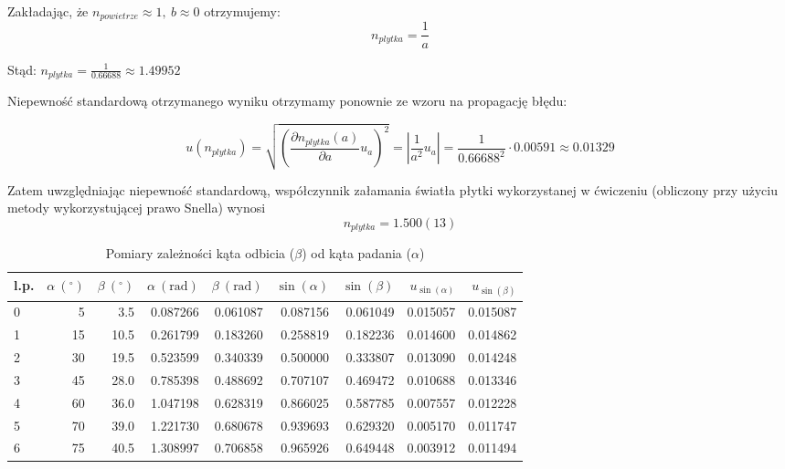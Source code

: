 \documentclass[a4paper]{article}
\newlength{\du}
\begin{document}
Zakładając, że $n_{powietrze} \approx 1, \ b \approx 0$ otrzymujemy:
\[ n_{plytka} = \frac{1}{a}\]

Stąd: $n_{plytka} = \frac{1}{0.66688} \approx 1.49952$

Niepewność standardową otrzymanego wyniku otrzymamy ponownie ze wzoru na propagację błędu:

\[
		u(n_{plytka}) = \sqrt{\left(\frac{\partial n_{plytka}(a)}{\partial a}u_{a}\right)^2} = 
		\left| \frac{1}{a^2} u_{a}\right| = \frac{1}{0.66688^2}\cdot 0.00591 \approx 0.01329
\]

Zatem uwzględniając niepewność standardową, współczynnik załamania światła płytki wykorzystanej w ćwiczeniu (obliczony przy użyciu metody wykorzystującej prawo Snella) wynosi \[ n_{plytka} = 1.500(13)\]
\begin{table}[h!]
\centering
\begin{tabular}{lrrrrrrrr}
\toprule

l.p.&  $\alpha \ ({}^\circ)$ & $\beta \ ({}^\circ)$ &  $\alpha \ (\text{rad})$ &  $\beta \ (\text{rad})$ &  $\sin(\alpha)$ &  $\sin(\beta)$ &  $u_{\sin(\alpha)}$ &  $u_{\sin(\beta)}$ \\
\midrule
0  &           5 &         3.5& 0.087266 &    0.061087 &   0.087156 &   0.061049 &              0.015057 &              0.015087 \\
1  &          15 &        10.5 & 0.261799 &    0.183260 &   0.258819 &   0.182236 &              0.014600 &              0.014862 \\
2 & 30 & 19.5 &0.523599 &    0.340339 &   0.500000 &   0.333807 &              0.013090 &              0.014248 \\
3&          45 &        28.0 & 0.785398 &    0.488692 &   0.707107 &   0.469472 &              0.010688 &              0.013346 \\
4&          60 &        36.0 & 1.047198 &    0.628319 &   0.866025 &   0.587785 &              0.007557 &              0.012228 \\
5  &          70 &        39.0& 1.221730 &    0.680678 &   0.939693 &   0.629320 &              0.005170 &              0.011747 \\
6 &          75 &        40.5& 1.308997 &    0.706858 &   0.965926 &   0.649448 &              0.003912 &              0.011494 \\
\bottomrule
\end{tabular}

\caption{Pomiary zależności kąta odbicia ($\beta$) od kąta padania ($\alpha$)}
\label{snell-pomiary}
\end{table}
\end{document}
